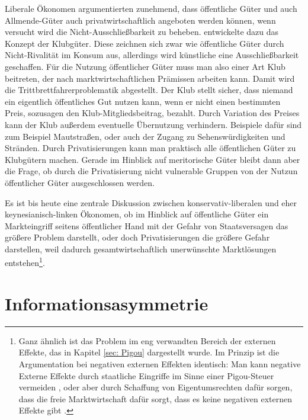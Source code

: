 Liberale Ökonomen argumentierten zunehmend, dass öffentliche Güter und auch Allmende-Güter auch privatwirtschaftlich angeboten werden können, wenn versucht wird die Nicht-Ausschließbarkeit zu beheben. \textcite{Buchanan1965} entwickelte dazu das Konzept der Klubgüter. Diese zeichnen sich zwar wie öffentliche Güter durch Nicht-Rivalität im Konsum aus, allerdings wird künstliche eine Ausschließbarkeit geschaffen. Für die Nutzung öffentlicher Güter muss man also einer Art Klub beitreten, der nach marktwirtschaftlichen Prämissen arbeiten kann. Damit wird die Trittbrettfahrerproblematik abgestellt. Der Klub stellt sicher, dass niemand ein eigentlich öffentliches Gut nutzen kann, wenn er nicht einen bestimmten Preis, sozusagen den Klub-Mitgliedsbeitrag, bezahlt. Durch Variation des Preises kann der Klub außerdem eventuelle Übernutzung verhindern. Beispiele dafür sind zum Beispiel Mautstraßen, oder auch der Zugang zu Sehenswürdigkeiten und Stränden. Durch Privatisierungen kann man praktisch alle öffentlichen Güter zu Klubgütern machen. Gerade im Hinblick auf meritorische Güter bleibt dann aber die Frage, ob durch die Privatisierung nicht vulnerable Gruppen von der Nutzun öffentlicher Güter ausgeschlossen werden. 

Es ist bis heute eine zentrale Diskussion zwischen konservativ-liberalen und eher keynesianisch-linken Ökonomen, ob im Hinblick auf öffentliche Güter ein Markteingriff seitens öffentlicher Hand mit der Gefahr von Staatsversagen das größere Problem darstellt, oder doch Privatisierungen die größere Gefahr darstellen, weil dadurch gesamtwirtschaftlich unerwünschte Marktlösungen entstehen\footnote{Ganz ähnlich ist das Problem im eng verwandten Bereich der externen Effekte, das in Kapitel \ref{sec: Pigou} dargestellt wurde. Im Prinzip ist die Argumentation bei negativen externen Effekten identisch: Man kann negative Externe Effekte durch staatliche Eingriffe im Sinne einer Pigou-Steuer vermeiden \parencite{Pigou1920}, oder aber durch Schaffung von Eigentumsrechten dafür sorgen, dass die freie Marktwirtschaft dafür sorgt, dass es keine negativen externen Effekte gibt \parencite{Coase1960}.}.


\section{Informationsasymmetrie}
\label{Info}

